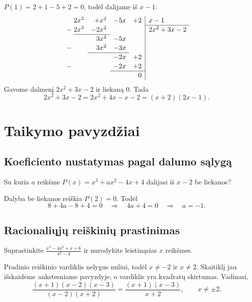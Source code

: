 \documentclass[11pt,a4paper]{scrartcl}
\begin{document}
\begin{solution}
\(P(1)=2+1-5+2=0\), todėl dalijame iš \(x-1\):
\[
\renewcommand{\arraystretch}{1.12}
\begin{array}{r@{\;}rrrr|l}
 &2x^3&+x^2&-5x&+2&x-1\\\cline{6-6}
 -&2x^3&-2x^2&&&2x^2+3x-2\\\cline{2-3}
 &&3x^2&-5x&&\\
 -&&3x^2&-3x&&\\\cline{3-4}
 &&&-2x&+2&\\
 -&&&-2x&+2&\\\cline{4-5}
 &&&&0&
\end{array}
\]
Gavome dalmenį \(2x^2+3x-2\) ir liekaną \(0\). Tada
\[2x^2+3x-2=2x^2+4x-x-2=(x+2)(2x-1).\]
\end{solution}
\newpage
\section{Taikymo pavyzdžiai}
\subsection{Koeficiento nustatymas pagal dalumo sąlygą}
\begin{example}
Su kuria \(a\) reikšme \(P(x)=x^3+ax^2-4x+4\) dalijasi iš \(x-2\) be liekanos?
\end{example}
\begin{solution}
Dalyba be liekanos reiškia \(P(2)=0\). Todėl
\[8+4a-8+4=0\quad\Longrightarrow\quad4a+4=0\quad\Longrightarrow\quad a=-1.\]
\end{solution}
\subsection{Racionaliųjų reiškinių prastinimas}
\begin{example}
Suprastinkite \(\displaystyle\frac{x^3-4x^2+x+6}{x^2-4}\) ir nurodykite leistinąsias \(x\) reikšmes.
\end{example}
\begin{solution}
Pradinio reiškinio vardiklis nelygus nuliui, todėl \(x\ne-2\) ir \(x\ne2\). Skaitiklį jau išskaidėme ankstesniame pavyzdyje, o vardiklis yra kvadratų skirtumas. Vadinasi,
\[
\frac{(x+1)(x-2)(x-3)}{(x-2)(x+2)}
=\frac{(x+1)(x-3)}{x+2},\qquad x\ne\pm2.
\]
\end{solution}
\end{document}
